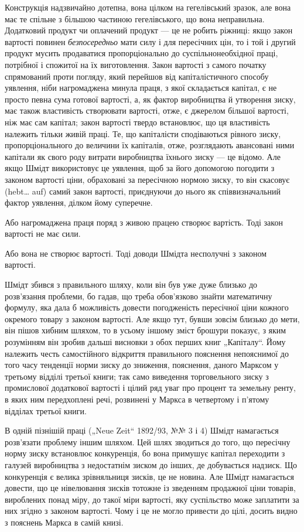 Конструкція надзвичайно дотепна, вона цілком на гегелівський
зразок, але вона має те спільне з більшою частиною гегелівського,
що вона неправильна. Додатковий продукт чи оплачений
продукт — це не робить ріжниці: якщо закон вартості повинен
\emph{безпосередньо} мати силу і для пересічних цін, то і той і другий
продукт мусить продаватися пропорціонально до суспільнонеобхідної
праці, потрібної і спожитої на їх виготовлення. Закон
вартості з самого початку спрямований проти погляду, який перейшов
від капіталістичного способу уявлення, ніби нагромаджена
минула праця, з якої складається капітал, є не просто певна сума
готової вартості, а, як фактор виробництва й утворення зиску, має
також властивість створювати вартості, отже, є джерелом більшої
вартості, ніж має сам капітал; закон вартості твердо встановлює,
що ця властивість належить тільки живій праці. Те, що капіталісти
сподіваються рівного зиску, пропорціонального до величини
їх капіталів, отже, розглядають авансовані ними капітали як свого
роду витрати виробництва їхнього зиску — це відомо. Але якщо
Шмідт використовує це уявлення, щоб за його допомогою погодити
з законом вартості ціни, обраховані за пересічною нормою
зиску, то він скасовує (hebt\dots{} auf) самий закон вартості, приєднуючи
до нього як співвизначальний фактор уявлення, ділком
йому суперечне.

Або нагромаджена праця поряд з живою працею створює
вартість. Тоді закон вартості не має сили.

Або вона не створює вартості. Тоді доводи Шмідта несполучні
з законом вартості.

Шмідт збився з правильного шляху, коли він був уже дуже
близько до розв’язання проблеми, бо гадав, що треба обов’язково
знайти математичну формулу, яка дала б можливість довести
погодженість пересічної ціни кожного окремого товару з законом
вартості. Але якщо тут, бувши зовсім близько до мети, він
пішов хибним шляхом, то в усьому іншому зміст брошури показує,
з яким розумінням він зробив дальші висновки з обох перших
книг „Капіталу“. Йому належить честь самостійного відкриття
правильного пояснення непояснимої до того часу тенденції норми
зиску до зниження, пояснення, даного Марксом у третьому відділі
третьої книги; так само виведення торговельного зиску з
промислової додаткової вартості і цілий ряд уваг про процент
та земельну ренту, в яких ним передхоплені речі, розвинені у
Маркса в четвертому і п’ятому відділах третьої книги.

В одній пізнішій праці („Neue Zeit“ 1892/93, №№ 3 і 4)
Шмідт намагається розв’язати проблему іншим шляхом. Цей
шлях зводиться до того, що пересічну норму зиску встановлює
конкуренція, бо вона примушує капітал переходити з галузей
виробництва з недостатнім зиском до інших, де добувається
надзиск. Що конкуренція є велика зрівняльниця зисків, це не
новина. Але Шмідт намагається довести, що це нівелювання
зисків тотожне із зведенням продажної ціни товарів, вироблених
понад міру, до такої міри вартості, яку суспільство може
заплатити за них згідно з законом вартості. Чому і це не
могло привести до цілі, досить видно з пояснень Маркса в самій
книзі.


